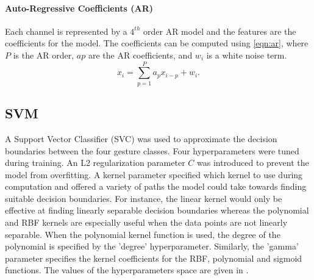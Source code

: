 \documentclass[journal]{IEEEtran}
\begin{document}
\paragraph{Auto-Regressive Coefficients (AR)}
Each channel is represented by a $4^{th}$ order AR model and the features are the coefficients for the model. The coefficients can be computed using \cref{eqn:ar}, where $P$ is the AR order, $ap$ are the AR coefficients, and $w_i$ is a white noise term.
\begin{equation}
 x_i = \sum_{p=1}^{P}a_px_{i-p}+w_i.
\label{eqn:ar}
\end{equation}

\subsection{SVM}
A Support Vector Classifier (SVC) was used to approximate the decision boundaries between the four gesture classes. Four hyperparameters were tuned during training. An L2 regularization parameter $C$ was introduced to prevent the model from overfitting. A kernel parameter specified which kernel to use during computation and offered a variety of paths the model could take towards finding suitable decision boundaries. For instance, the linear kernel would only be effective at finding linearly separable decision boundaries whereas the polynomial and RBF kernels are especially useful when the data points are not linearly separable. When the polynomial kernel function is used, the degree of the polynomial is specified by the 'degree' hyperparameter. Similarly, the 'gamma' parameter specifies the kernel coefficients for the RBF, polynomial and sigmoid functions. The values of the hyperparameters space are given in .

\begingroup
\def\arraystretch{1.2}%
\setlength{\tabcolsep}{2pt} %
\begin{table}[b]
	\centering
	\caption{SVM Hyperparameter Tuning Space.}
	\label{table:svm_param}
\end{table}%
\endgroup
\end{document}
